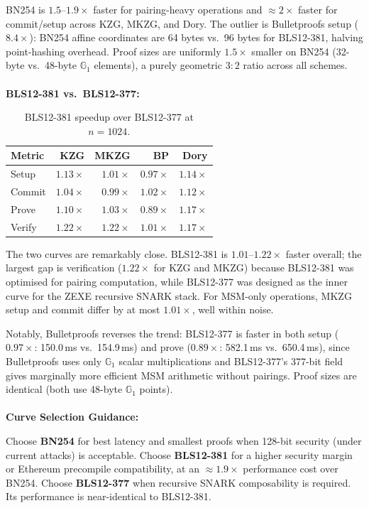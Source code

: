 BN254 is $1.5$--$1.9\times$ faster for pairing-heavy operations and
$\approx 2\times$ faster for commit/setup across KZG, MKZG, and Dory.
The outlier is Bulletproofs setup ($8.4\times$): BN254 affine
coordinates are 64 bytes vs.\ 96 bytes for BLS12-381, halving
point-hashing overhead. Proof sizes are uniformly $1.5\times$ smaller
on BN254 (32-byte vs.\ 48-byte $\mathbb{G}_1$ elements), a purely
geometric $3:2$ ratio across all schemes.
\\\\
\textbf{BLS12-381 vs.\ BLS12-377:}

\begin{table}[H]
\centering
\caption{BLS12-381 speedup over BLS12-377 at $n = 1024$.}
\label{tab:curve-ratio-377}
\begin{tabular}{lrrrr}
\toprule
\textbf{Metric} & \textbf{KZG} & \textbf{MKZG} & \textbf{BP} & \textbf{Dory} \\
\midrule
Setup  & $1.13\times$ & $1.01\times$ & $0.97\times$ & $1.14\times$ \\
Commit & $1.04\times$ & $0.99\times$ & $1.02\times$ & $1.12\times$ \\
Prove  & $1.10\times$ & $1.03\times$ & $0.89\times$ & $1.17\times$ \\
Verify & $1.22\times$ & $1.22\times$ & $1.01\times$ & $1.17\times$ \\
\bottomrule
\end{tabular}
\end{table}

The two curves are remarkably close. BLS12-381 is $1.01$--$1.22\times$
faster overall; the largest gap is verification ($1.22\times$ for KZG
and MKZG) because BLS12-381 was optimised for pairing computation,
while BLS12-377 was designed as the inner curve for the ZEXE recursive
SNARK stack. For MSM-only operations, MKZG setup and commit differ by
at most $1.01\times$, well within noise.

Notably, Bulletproofs reverses the trend: BLS12-377 is faster in both
setup ($0.97\times$: 150.0\,ms vs.\ 154.9\,ms) and prove ($0.89\times$:
582.1\,ms vs.\ 650.4\,ms), since Bulletproofs uses only
$\mathbb{G}_1$ scalar multiplications and BLS12-377's 377-bit field
gives marginally more efficient MSM arithmetic without pairings.
Proof sizes are identical (both use 48-byte $\mathbb{G}_1$ points).\\\\
\textbf{Curve Selection Guidance:}

Choose \textbf{BN254} for best latency and smallest proofs when
128-bit security (under current attacks) is acceptable.
Choose \textbf{BLS12-381} for a higher security margin or Ethereum
precompile compatibility, at an $\approx 1.9\times$ performance cost
over BN254. Choose \textbf{BLS12-377} when recursive SNARK
composability is required. Its performance is near-identical to
BLS12-381.




